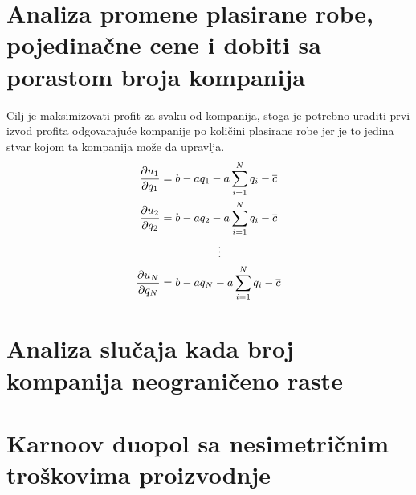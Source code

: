 \documentclass[12pt]{article}
\begin{document}
\section{Analiza promene plasirane robe, pojedinačne cene i dobiti sa porastom
broja kompanija}
\par Cilj je maksimizovati profit za svaku od kompanija, stoga je potrebno
uraditi prvi izvod profita odgovarajuće kompanije po količini plasirane robe
jer je to jedina stvar kojom ta kompanija može da upravlja.
\begin{align*}
	\frac{\partial u_1}{\partial q_1} &= b - a q_1 - a \sum_{i=1}^N q_i
	- \overline{c}\\ 
	\frac{\partial u_2}{\partial q_2} &= b - a q_2 - a \sum_{i=1}^N q_i
	- \overline{c}\\ 
		&\hspace{1.8cm}\vdots \\
	\frac{\partial u_N}{\partial q_N} &= b - a q_N - a \sum_{i=1}^N q_i
	- \overline{c}\\ 
\end{align*}
\section{Analiza slučaja kada broj kompanija neograničeno raste}
\section{Karnoov duopol sa nesimetričnim troškovima proizvodnje}
\end{document}
